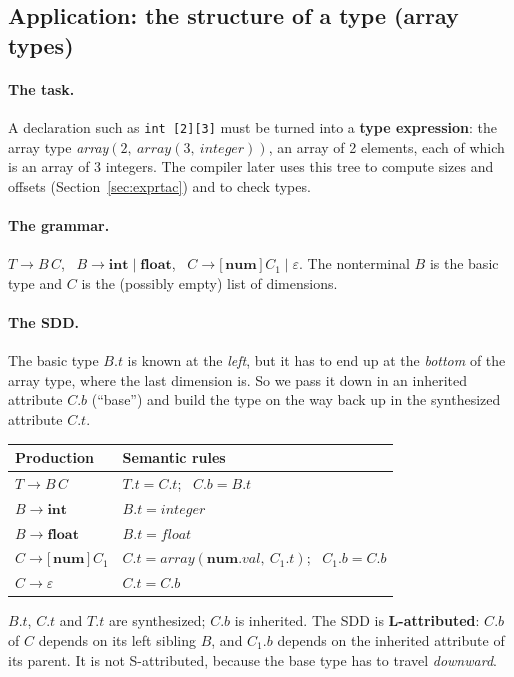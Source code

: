 \documentclass[11pt,a4paper]{article}
\newcommand{\at}[2]{\ensuremath{#1.\mathit{#2}}}
\newcommand{\tok}[1]{\ensuremath{\mathtt{#1}}}
\begin{document}
\subsection{Application: the structure of a type (array types)}
\label{sec:typestruct}

\paragraph{The task.} A declaration such as \texttt{int [2][3]} must be turned into a \textbf{type expression}: the array type \textit{array}$(2,\ \textit{array}(3,\ \mathit{integer}))$, an array of 2 elements, each of which is an array of 3 integers. The compiler later uses this tree to compute sizes and offsets (Section~\ref{sec:exprtac}) and to check types.

\paragraph{The grammar.} $T\to B\,C$, \ $B\to\mathbf{int}\mid\mathbf{float}$, \ $C\to\tok{[}\,\mathbf{num}\,\tok{]}\,C_1\mid\varepsilon$. The nonterminal $B$ is the basic type and $C$ is the (possibly empty) list of dimensions.

\paragraph{The SDD.} The basic type $B.t$ is known at the \emph{left}, but it has to end up at the \emph{bottom} of the array type, where the last dimension is. So we pass it down in an inherited attribute $C.b$ (``base'') and build the type on the way back up in the synthesized attribute $C.t$.
\begin{center}
\small
\begin{tabular}{@{}l l@{}}
\toprule
\textbf{Production} & \textbf{Semantic rules} \\ \midrule
$T \to B\,C$ & $\at{T}{t}=\at{C}{t}$; \ $\at{C}{b}=\at{B}{t}$ \\
$B \to \mathbf{int}$ & $\at{B}{t}=\mathit{integer}$ \\
$B \to \mathbf{float}$ & $\at{B}{t}=\mathit{float}$ \\
$C \to \tok{[}\,\mathbf{num}\,\tok{]}\,C_1$ & $\at{C}{t}=\mathit{array}(\at{\mathbf{num}}{val},\ \at{C_1}{t})$; \ $\at{C_1}{b}=\at{C}{b}$ \\
$C \to \varepsilon$ & $\at{C}{t}=\at{C}{b}$ \\ \bottomrule
\end{tabular}
\end{center}
$B.t$, $C.t$ and $T.t$ are synthesized; $C.b$ is inherited. The SDD is \textbf{L-attributed}: $C.b$ of $C$ depends on its left sibling $B$, and $C_1.b$ depends on the inherited attribute of its parent. It is not S-attributed, because the base type has to travel \emph{downward}.
\end{document}
